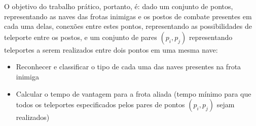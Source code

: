 O objetivo do trabalho prático, portanto, é: dado um conjunto de pontos, representando as naves das frotas inimigas e os postos de combate presentes em cada uma delas, conexões entre estes pontos, representando as possibilidades de teleporte entre os postos, e um conjunto de pares $(p_i, p_j)$ representando teleportes a serem realizados entre dois pontos em uma mesma nave: 
\begin{itemize}
    \item Reconhecer e classificar o tipo de cada uma das naves presentes na frota inimiga
    \item Calcular o tempo de vantagem para a frota aliada (tempo mínimo para que todos os teleportes especificados pelos pares de pontos $(p_i, p_j)$ sejam realizados)
\end{itemize}


